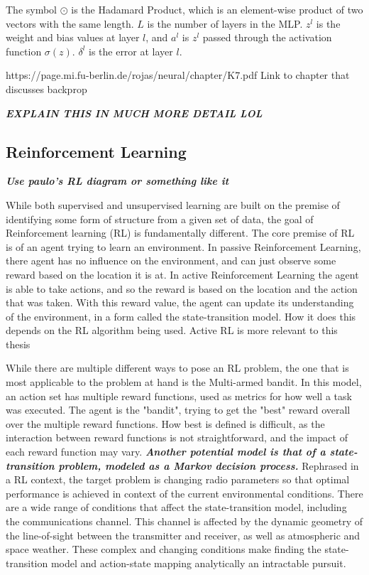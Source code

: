 	\par The symbol $\odot$ is the Hadamard Product, which is an element-wise product of two vectors with the same length. $L$ is the number of layers in the MLP. $z^l$ is the weight and bias values at layer $l$, and $a^l$ is $z^l$ passed through the activation function $\sigma(z)$. $\delta^l$ is the error at layer $l$.
	\par https://page.mi.fu-berlin.de/rojas/neural/chapter/K7.pdf Link to chapter that discusses backprop
	\par \textbf{\textit{ EXPLAIN THIS IN MUCH MORE DETAIL LOL}}
	\subsection{Reinforcement Learning}
	\textbf{\textit{Use paulo's RL diagram or something like it}}
	\par While both supervised and unsupervised learning are built on the premise of identifying some form of structure from a given set of data, the goal of Reinforcement learning (RL) is fundamentally different. The core premise of RL is of an agent trying to learn an environment. In passive Reinforcement Learning, there agent has no influence on the environment, and can just observe some reward based on the location it is at. In active Reinforcement Learning the agent is able to take actions, and so the reward is based on the location and the action that was taken. With this reward value, the agent can update its understanding of the environment, in a form called the state-transition model. How it does this depends on the RL algorithm being used. Active RL is more relevant to this thesis
	\par While there are multiple different ways to pose an RL problem, the one that is most applicable to the problem at hand is the Multi-armed bandit. In this model, an action set has multiple reward functions, used as metrics for how well a task was executed. 
	The agent is the "bandit", trying to get the "best" reward overall over the multiple reward functions. How best is defined is difficult, as the interaction between reward functions is not straightforward, and the impact of each reward function may vary. 
	 \textbf{\textit{Another potential model is that of a state-transition problem, modeled as a Markov decision process.}} Rephrased in a RL context, the target problem is changing radio parameters so that optimal performance is achieved in context of the current environmental conditions. There are a wide range of conditions that affect the state-transition model, including the communications channel. This channel is affected by the dynamic geometry of the line-of-sight between the transmitter and receiver, as well as atmospheric and space weather. These complex and changing conditions make finding the state-transition model and action-state mapping analytically an intractable pursuit. 
